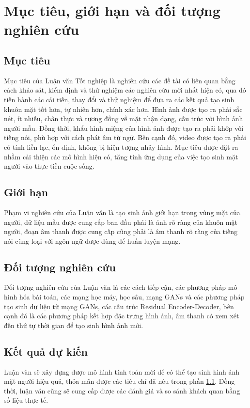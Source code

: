 \section{\texorpdfstring{Mục tiêu, giới hạn và đối tượng nghiên cứu}{Target, limitation}}
\subsection{\texorpdfstring{Mục tiêu}{Target}}
\label{target_label}
Mục tiêu của Luận văn Tốt nghiệp là nghiên cứu các đề tài có liên quan bằng cách khảo sát, kiểm định và thử nghiệm các nghiên cứu mới nhất hiện có, qua đó tiến hành các cải tiến, thay đổi và thử nghiệm để đưa ra các kết quả tạo sinh khuôn mặt tốt hơn, tự nhiên hơn, chính xác hơn. Hình ảnh được tạo ra phải sắc nét, ít nhiễu, chân thực và tương đồng về mặt nhận dạng, cấu trúc với hình ảnh người mẫu. Đồng thời, khẩu hình miệng của hình ảnh được tạo ra phải khớp với tiếng nói, phù hợp với cách phát âm từ ngữ. Bên cạnh đó, video được tạo ra phải có tính liền lạc, ổn định, không bị hiện tượng nhảy hình. Mục tiêu được đặt ra nhằm cải thiện các mô hình hiện có, tăng tính ứng dụng của việc tạo sinh mặt người vào thực tiễn cuộc sống.

\subsection{\texorpdfstring{Giới hạn}{Limitation}}
Phạm vi nghiên cứu của Luận văn là tạo sinh ảnh giới hạn trong vùng mặt của người, dữ liệu mẫu được cung cấp ban đầu phải là ảnh rõ ràng của khuôn mặt người, đoạn âm thanh được cung cấp cũng phải là âm thanh rõ ràng của tiếng nói cùng loại với ngôn ngữ được dùng để huấn luyện mạng.

\subsection{\texorpdfstring{Đối tượng nghiên cứu}{Research}}
Đối tượng nghiên cứu của Luận văn là các cách tiếp cận, các phương pháp mô hình hóa bài toán, các mạng học máy, học sâu, mạng GANs và các phương pháp tạo sinh dữ liệu từ mạng GANs, các cấu trúc Residual Encoder-Decoder, bên cạnh đó là các phương pháp kết hợp đặc trưng hình ảnh, âm thanh có xem xét đến thứ tự thời gian để tạo sinh hình ảnh mới.

\subsection{\texorpdfstring{Kết quả dự kiến}{Result}}
Luận văn sẽ xây dựng được mô hình tính toán mới để có thể tạo sinh hình ảnh mặt người hiệu quả, thỏa mãn được các tiêu chí đã nêu trong phần \ref{target_label}. Đồng thời, luận văn cũng sẽ cung cấp được các đánh giá và so sánh khách quan bằng số liệu thực tế.

